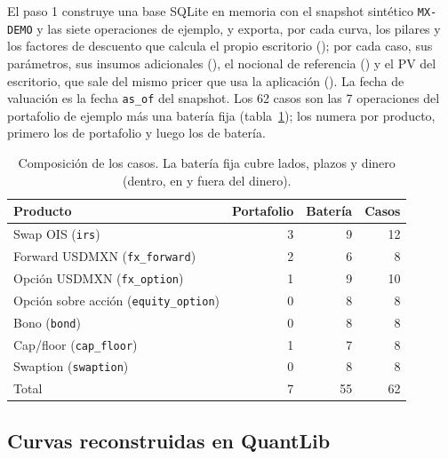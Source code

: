 El paso 1 construye una base SQLite en memoria con el snapshot sintético \texttt{MX-DEMO} y las siete operaciones de
ejemplo, y exporta, por cada curva, los pilares y los factores de descuento que calcula el propio escritorio
(); por cada caso, sus parámetros, sus insumos
adicionales (), el nocional de referencia
() y el PV del escritorio, que sale del mismo pricer que usa la
aplicación (). La fecha de valuación es la fecha \texttt{as\_of} del
snapshot. Los 62 casos son las 7 operaciones del portafolio de ejemplo más una batería fija
(tabla~\ref{tab:cap12-casos});  los numera por producto, primero los
de portafolio y luego los de batería.

\begin{table}[ht]
\centering
\begin{tabular}{@{}lrrr@{}}
\toprule
Producto & Portafolio & Batería & Casos \\
\midrule
Swap OIS (\texttt{irs}) & 3 & 9 & 12 \\
Forward USDMXN (\texttt{fx\_forward}) & 2 & 6 & 8 \\
Opción USDMXN (\texttt{fx\_option}) & 1 & 9 & 10 \\
Opción sobre acción (\texttt{equity\_option}) & 0 & 8 & 8 \\
Bono (\texttt{bond}) & 0 & 8 & 8 \\
Cap/floor (\texttt{cap\_floor}) & 1 & 7 & 8 \\
Swaption (\texttt{swaption}) & 0 & 8 & 8 \\
\midrule
Total & 7 & 55 & 62 \\
\bottomrule
\end{tabular}
\caption{Composición de los casos. La batería fija cubre lados, plazos y dinero (dentro, en y fuera del dinero).}\label{tab:cap12-casos}
\end{table}

\subsection{Curvas reconstruidas en QuantLib}\label{sec:cap12-curvas}

